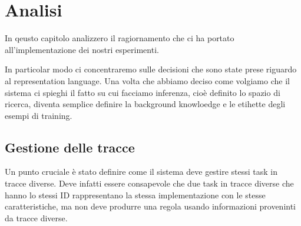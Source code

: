 \chapter{Analisi}
In qeusto capitolo analizzero il ragiornamento che ci ha portato all'implementazione dei nostri esperimenti.

In particolar modo ci concentraremo sulle decisioni che sono state prese riguardo al representation language. Una volta che abbiamo deciso come volgiamo che il sistema ci spieghi il fatto su cui facciamo inferenza, cioè definito lo spazio di ricerca, diventa semplice definire la background knowloedge e le etihette degli esempi di training.

\section{Gestione delle tracce}
Un punto cruciale è stato definire come il sistema deve gestire stessi task in tracce diverse. Deve infatti essere consapevole che due task in tracce diverse che hanno lo stessi ID rappresentano la stessa implementazione con le stesse caratteristiche, ma non deve produrre una regola usando informazioni proveninti da tracce diverse.

